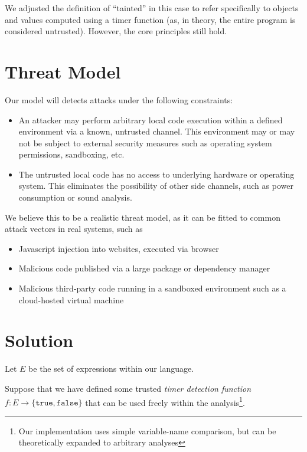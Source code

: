 \documentclass[12pt]{article}
\begin{document}
\begin{multicols*}{2}
  We adjusted the definition of ``tainted'' in this case to refer specifically
  to objects and values computed using a timer function (as, in
  theory, the entire program is considered untrusted). However, the
  core principles still hold.

  \section{Threat Model}

  Our model will detects attacks under the following constraints:

  \begin{itemize}
    \item An attacker may perform arbitrary local code execution within a
        defined environment via a known, untrusted channel. This
        environment may or may not be subject to external security
        measures such as operating system permissions, sandboxing,
        etc.
    \item The untrusted local code has no access to underlying
        hardware or operating system. This eliminates the possibility
        of other side channels, such as power consumption or sound
        analysis.
  \end{itemize}

  We believe this to be a realistic threat model, as it can be fitted
  to common attack vectors in real systems, such as

  \begin{itemize}
    \item Javascript injection into websites, executed via
        browser
    \item Malicious code published via a large package or dependency
        manager
    \item Malicious third-party code running in a sandboxed
        environment such as a cloud-hosted virtual machine
  \end{itemize}

  \section{Solution}

  Let $E$ be the set of expressions within our language.

  Suppose that we have defined some trusted \textit{timer detection function}
  $f: E \rightarrow \{\texttt{true}, \texttt{false}\}$ that can be used freely
  within the analysis\footnote{Our implementation uses simple
  variable-name comparison, but can be theoretically expanded to
  arbitrary analyses}.


\end{multicols*}
\end{document}
